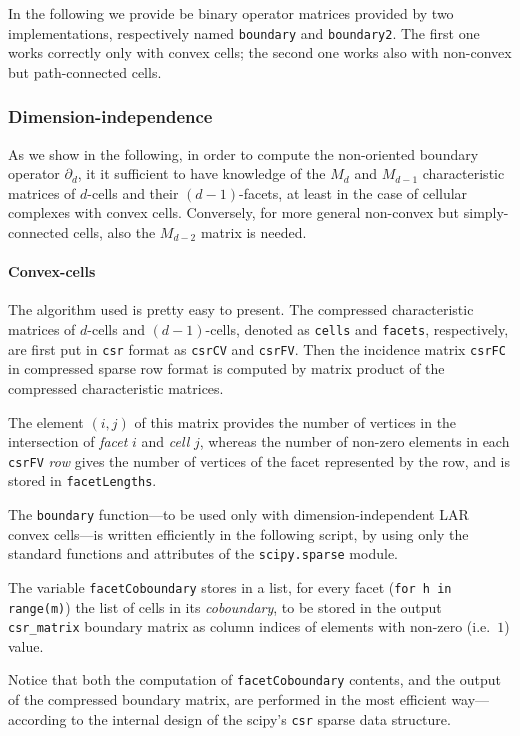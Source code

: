 \documentclass[11pt,oneside]{article}	%
\begin{document}
In the following we provide be binary operator matrices provided by two implementations,
respectively named \texttt{boundary} and \texttt{boundary2}. The first one works correctly only with convex cells; the second one works also with non-convex but path-connected cells.


\subsubsection{Dimension-independence}

As we show in the following, in order to compute the non-oriented boundary operator $\partial_d$, it it sufficient to have knowledge of the $M_d$ and $M_{d-1}$ characteristic matrices of $d$-cells and their $(d-1)$-facets, at least in the case of cellular complexes with convex cells. Conversely, for more general non-convex but simply-connected cells, also the $M_{d-2}$ matrix is needed.

\paragraph{Convex-cells}

The algorithm used is pretty easy to present. The compressed characteristic matrices of $d$-cells and $(d-1)$-cells, denoted as \texttt{cells} and \texttt{facets}, respectively, are first put in \texttt{csr} format as \texttt{csrCV} and \texttt{csrFV}. Then the incidence matrix \texttt{csrFC} in compressed sparse row format is computed by matrix product of the compressed characteristic matrices. 

The element $(i,j)$ of this matrix provides the number of vertices in the intersection of \emph{facet} $i$ and \emph{cell} $j$, whereas the number of non-zero elements in each \texttt{csrFV} \emph{row} gives the number of vertices of the facet represented by the row, and is stored in \texttt{facetLengths}. 

The \texttt{boundary} function---to be used only with dimension-independent LAR convex cells---is written efficiently in the following script, by using only the standard functions and attributes of the \texttt{scipy.sparse} module.

The variable \texttt{facetCoboundary} stores in a list, for every facet (\texttt{for h in range(m)})
the list of cells in its \emph{coboundary}, to be stored in the output \texttt{csr\_matrix} boundary matrix as column indices of elements with non-zero (i.e.~$1$) value.

Notice that both the computation of \texttt{facetCoboundary} contents, and the output of the compressed boundary matrix, are performed in the most efficient way---according to the internal design of the scipy's \texttt{csr} sparse data structure.
\end{document}
